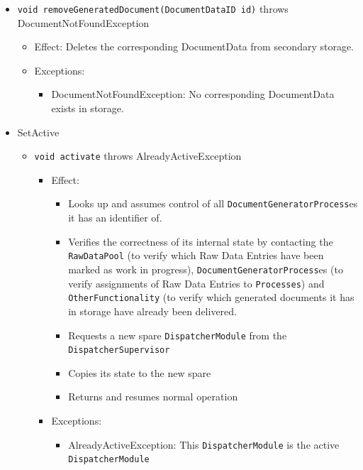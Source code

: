 \documentclass[a4paper,10pt]{article}
\begin{document}
\begin{itemize}
\begin{itemize}
		\item \texttt{void removeGeneratedDocument(DocumentDataID id)} throws DocumentNotFoundException
		\begin{itemize}
			\item Effect: Deletes the corresponding DocumentData from secondary storage.
			\item Exceptions:
			\begin{itemize}
				\item DocumentNotFoundException: No corresponding DocumentData exists in storage.
			\end{itemize}
		\end{itemize}
	\end{itemize}
\end{itemize}

\begin{itemize}
	\item SetActive
	\begin{itemize}
		\item \texttt{void activate} throws AlreadyActiveException
		\begin{itemize}
			\item Effect: 
			\begin{itemize}
				\item Looks up and assumes control of all \texttt{DocumentGeneratorProcess}es it has an identifier of.
				\item Verifies the correctness of its internal state by contacting the \texttt{RawDataPool} (to verify which Raw Data Entries have been marked as work in progress), \texttt{DocumentGeneratorProcess}es (to verify assignments of Raw Data Entries to \texttt{Processes}) and \texttt{OtherFunctionality} (to verify which generated documents it has in storage have already been delivered.
				\item Requests a new spare \texttt{DispatcherModule} from the \texttt{DispatcherSupervisor}
				\item Copies its state to the new spare
				\item Returns and resumes normal operation
			\end{itemize}
			\item Exceptions: 
			\begin{itemize}
				\item AlreadyActiveException: This \texttt{DispatcherModule} is the active \texttt{DispatcherModule}
			\end{itemize}
		\end{itemize}
	\end{itemize}
\end{itemize}
\end{document}
